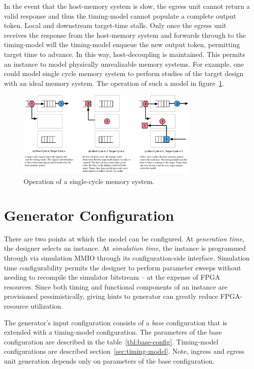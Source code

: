 In the event that the host-memory system is slow, the egress unit cannot return
a valid response and thus the timing-model cannot populate a complete output
token. Local and downstream target-time stalls. Only once the egress unit
receives the response from the host-memory system and forwards through to the
timing-model will the timing-model enqueue the new output token, permitting
target time to advance.  In this way, host-decoupling is maintained. This
permits an instance to model physically unrealizable memory systems. For
example, one could model single cycle memory system to perform studies of the
target design with an ideal memory system. The operation of such a model in
figure~\ref{fig:model_operation}.

\begin{figure} \centering
\includegraphics[width=0.8\textwidth]{figures/memory-model-operation.pdf}
\caption{Operation of a single-cycle memory system.}
\label{fig:model_operation} \end{figure}

\section{Generator Configuration}\label{sec:generator-parameters}

There are two points at which the model can be configured.  At
\textit{generation time}, the designer selects an instance. At
\textit{simulation time}, the instance is programmed through via simulation
MMIO through its configuration-side interface. Simulation time configurability
permits the designer to perform parameter sweeps without needing to recompile
the simulator bitstream -- at the expense of FPGA resources. Since both timing
and functional components of an instance are provisioned pessimistically,
giving hints to generator can greatly reduce FPGA-resource utilization.

The generator's input configuration consists of a \emph{base} configuration
that is extended with a timing-model configuration. The parameters of the base
configuration are described in the table~\ref{tbl:base-config}. Timing-model
configurations are described section~\ref{sec:timing-model}. Note, ingress and
egress unit generation depends only on parameters of the base configuration.

